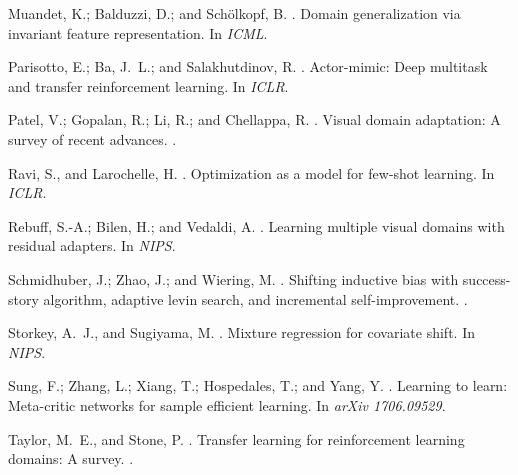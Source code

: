 \documentclass[letterpaper]{article} \usepackage{aaai18}  \usepackage{times}  \usepackage{helvet}  \usepackage{courier}  \usepackage{url}  \usepackage{graphicx}  \usepackage{amsmath}
\begin{document}
{{\begin{thebibliography}{}
Muandet, K.; Balduzzi, D.; and Sch{\"o}lkopf, B.
.
\newblock Domain generalization via invariant feature representation.
\newblock In {\em ICML}.

Parisotto, E.; Ba, J.~L.; and Salakhutdinov, R.
.
\newblock Actor-mimic: Deep multitask and transfer reinforcement learning.
\newblock In {\em ICLR}.

Patel, V.; Gopalan, R.; Li, R.; and Chellappa, R.
.
\newblock Visual domain adaptation: A survey of recent advances.
.

Ravi, S., and Larochelle, H.
.
\newblock Optimization as a model for few-shot learning.
\newblock In {\em ICLR}.

Rebuff, S.-A.; Bilen, H.; and Vedaldi, A.
.
\newblock Learning multiple visual domains with residual adapters.
\newblock In {\em NIPS}.

Schmidhuber, J.; Zhao, J.; and Wiering, M.
.
\newblock Shifting inductive bias with success-story algorithm, adaptive levin
  search, and incremental self-improvement.
.

Storkey, A.~J., and Sugiyama, M.
.
\newblock Mixture regression for covariate shift.
\newblock In {\em NIPS}.

Sung, F.; Zhang, L.; Xiang, T.; Hospedales, T.; and Yang, Y.
.
\newblock Learning to learn: Meta-critic networks for sample efficient
  learning.
\newblock In {\em arXiv 1706.09529}.

Taylor, M.~E., and Stone, P.
.
\newblock Transfer learning for reinforcement learning domains: A survey.
.


\end{thebibliography}}}
\end{document}
